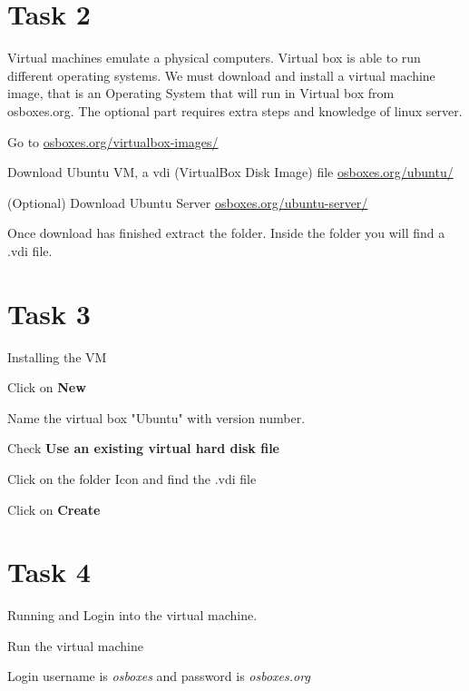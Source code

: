 \documentclass[12pt]{article}
\begin{document}
\section*{Task 2} 
Virtual machines emulate a physical computers. Virtual box is able to run different operating systems. We must download and install a virtual machine image, that is an Operating System that will run in Virtual box from osboxes.org.  The optional part requires extra steps and knowledge of linux server. 
\begin{todolist}
    \item Go to \color{red}
    \href{https://www.osboxes.org/virtualbox-images/}{osboxes.org/virtualbox-images/} \color{black}
    \item Download Ubuntu VM, a vdi (VirtualBox Disk Image) file \color{red} \href{https://www.osboxes.org/ubuntu/}{osboxes.org/ubuntu/} \color{black}
    \item (Optional) Download Ubuntu Server \color{red}
    \href{https://www.osboxes.org/ubuntu-server/}{osboxes.org/ubuntu-server/} \color{black}
    \item Once download has finished extract the folder. Inside the folder you will find a .vdi file. 
\end{todolist}

\section*{Task 3}
Installing the VM 
\begin{todolist}
    \item Click on \textbf{New} 
    \item Name the virtual box "Ubuntu" with version number. 
    \item Check \textbf{Use an existing virtual hard disk file } 
    \item Click on the folder Icon and find the .vdi file
    \item Click on \textbf{Create}
\end{todolist}
\section*{Task 4}
Running and Login  into the virtual machine. 
\begin{todolist}
    \item Run the virtual machine
    \item Login username is \textit{osboxes} and password is \textit{osboxes.org}
\end{todolist}
\end{document}
